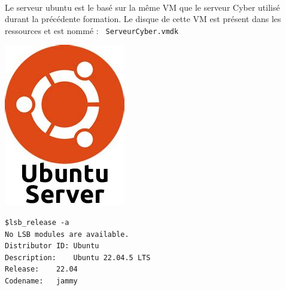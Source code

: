 \documentclass[french, 12pt]{article}%
\begin{document}
\
\begin{minipage}{0.6\linewidth}
Le serveur ubuntu est le basé sur la même VM que le serveur Cyber utilisé durant la précédente formation. Le disque de cette VM est présent dans les ressources et est nommé : \verb? ServeurCyber.vmdk? 

\end{minipage}
\begin{minipage}{0.39\linewidth}
\begin{center}
\includegraphics[scale=0.3]{./ressource/serveurUbuntu.jpeg}
\end{center}
\end{minipage}


\vspace{0.5cm}
\begin{lstlisting}[style=commande]
$lsb_release -a
No LSB modules are available.
Distributor ID:	Ubuntu
Description:	Ubuntu 22.04.5 LTS
Release:	22.04
Codename:	jammy
\end{lstlisting}
\end{document}
